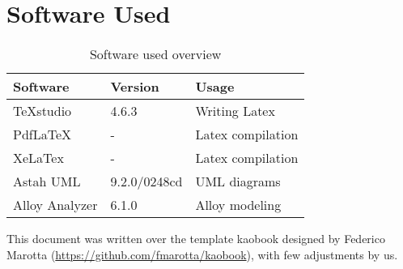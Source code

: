 \chapter{Software Used}
	\begin{center}
		\begin{table}[H]
			\begin{tabular}{ | m{3cm} | m{3cm} | m{3cm} | } 
					\hline
					\textbf {Software} & \textbf{Version} & \textbf{Usage} \\
					\hline
					TeXstudio & 4.6.3 & Writing Latex \\
					\hline
					PdfLaTeX & - & Latex compilation \\
					\hline
					XeLaTex & - & Latex compilation \\
					\hline
					Astah UML & 9.2.0/0248cd & UML diagrams \\
					\hline
					Alloy Analyzer & 6.1.0 & Alloy modeling \\
					\hline
				\end{tabular}
			\caption{Software used overview}
		\end{table}
		\end{center}
	
		This document was written over the template kaobook designed by Federico Marotta (\url{https://github.com/fmarotta/kaobook}), with few adjustments by us.